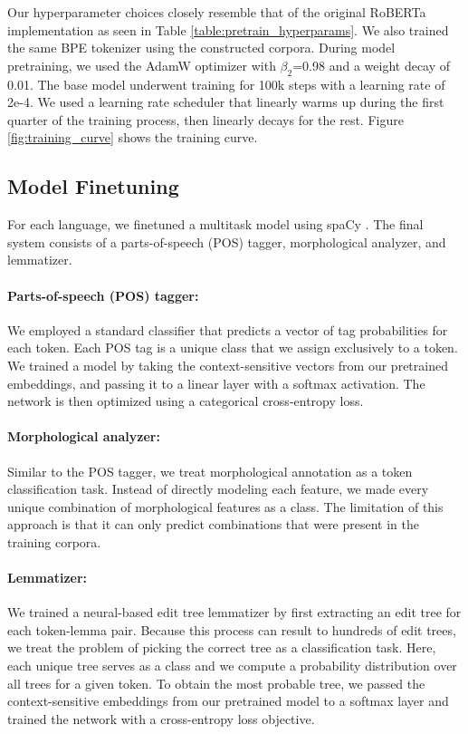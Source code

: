 \documentclass[11pt]{article}
\begin{document}


Our hyperparameter choices closely resemble that of the original RoBERTa implementation as seen in Table \ref{table:pretrain_hyperparams}.
We also trained the same BPE tokenizer \citep{sennrich-etal-2016-neural} using the constructed corpora.
During model pretraining, we used the AdamW optimizer with $\beta_2$=0.98 and a weight decay of 0.01.
The base model underwent training for 100k steps with a learning rate of 2e-4.
We used a learning rate scheduler that linearly warms up during the first quarter of the training process, then linearly decays for the rest.
Figure \ref{fig:training_curve} shows the training curve.

\subsection{Model Finetuning}

For each language, we finetuned a multitask model using spaCy \cite{honnibal-etal-2020-spacy}. 
The final system consists of a parts-of-speech (POS) tagger, morphological analyzer, and lemmatizer.

\paragraph{Parts-of-speech (POS) tagger:}
We employed a standard classifier that predicts a vector of tag probabilities for each token.
Each POS tag is a unique class that we assign exclusively to a token.
We trained a model by taking the context-sensitive vectors from our pretrained embeddings, and passing it to a linear layer with a softmax activation.
The network is then optimized using a categorical cross-entropy loss.

\paragraph{Morphological analyzer:}
Similar to the POS tagger, we treat morphological annotation as a token classification task.
Instead of directly modeling each feature, we made every unique combination of morphological features as a class.
The limitation of this approach is that it can only predict combinations that were present in the training corpora.

\paragraph{Lemmatizer:} 
We trained a neural-based edit tree lemmatizer \cite{muller-etal-2015-joint} by first extracting an edit tree for each token-lemma pair.
Because this process can result to hundreds of edit trees, we treat the problem of picking the correct tree as a classification task.
Here, each unique tree serves as a class and we compute a probability distribution over all trees for a given token.
To obtain the most probable tree, we passed the context-sensitive embeddings from our pretrained model to a softmax layer and trained the network with a cross-entropy loss objective.
\end{document}
